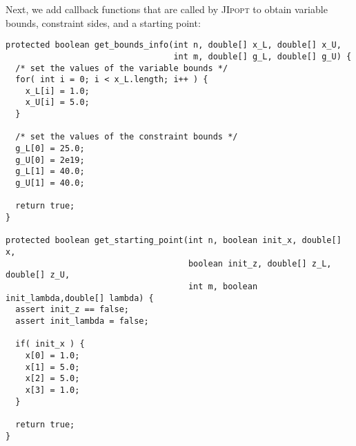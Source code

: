 \documentclass[10pt]{article}
\newcommand{\JIpopt}{\textsc{JIpopt}\xspace}
\begin{document}
\noindent Next, we add callback functions that are called by \JIpopt to obtain
variable bounds, constraint sides, and a starting point:
\begin{verbatim}
protected boolean get_bounds_info(int n, double[] x_L, double[] x_U,
                                  int m, double[] g_L, double[] g_U) {
  /* set the values of the variable bounds */
  for( int i = 0; i < x_L.length; i++ ) {
    x_L[i] = 1.0;
    x_U[i] = 5.0;
  }
  
  /* set the values of the constraint bounds */
  g_L[0] = 25.0;
  g_U[0] = 2e19;
  g_L[1] = 40.0;
  g_U[1] = 40.0;
        
  return true;
}
    
protected boolean get_starting_point(int n, boolean init_x, double[] x,
                                     boolean init_z, double[] z_L, double[] z_U,
                                     int m, boolean init_lambda,double[] lambda) {
  assert init_z == false;
  assert init_lambda = false;
  
  if( init_x ) {
    x[0] = 1.0;
    x[1] = 5.0;
    x[2] = 5.0;
    x[3] = 1.0;
  }
        
  return true;
}
\end{verbatim}
\end{document}
